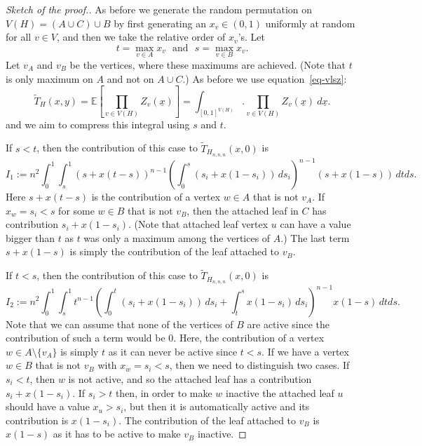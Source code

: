 \documentclass[12pt,a4paper]{amsart}
\numberwithin{equation}{section}
\theoremstyle{plain}
\theoremstyle{definition}
\newcommand{\1}{\textbf{1}}
\newcommand{\wT}{\widetilde{T}}
\begin{document}
\begin{proof}[Sketch of the proof.]
As before we generate the random permutation on \\ $V(H)=(A\cup C)\cup B$ by first generating an $x_v\in (0,1)$ uniformly at random for all $v\in V$, and then we take the relative order of $x_v$'s. Let
$$t=\max_{v\in A}x_v\ \ \ \text{and}\ \ \ s=\max_{v\in B}x_v.$$
Let $v_A$ and $v_B$ be the vertices, where these maximums are achieved.
(Note that $t$ is only maximum on $A$ and not on $A\cup C$.) As before we use equation~\ref{eq-vlsz}:
\begin{equation*} 
\wT_H(x,y)=\mathbb{E}\left[\prod_{v\in V(H)}Z_v(\underline{x})\right]=\int_{[0,1]^{V(H)}}.\prod_{v\in V(H)}Z_v(\underline{x})\ d\underline{x}.
\end{equation*}
and we aim to compress this integral using $s$ and $t$.

If $s<t$, then the contribution of this case to $\wT_{H_{n,n,n}}(x,0)$ is
\begin{equation} \label{int1}
I_1:=n^2\int_0^1\int_s^1(s+x(t-s))^{n-1}\left(\int_{0}^s(s_i+x(1-s_i))\, ds_i\right)^{n-1}(s+x(1-s))\, dt ds.
\end{equation}
Here $s+x(t-s)$ is the contribution of a vertex $w\in A$ that is not $v_A$. If $x_w=s_i<s$ for some $w\in B$ that is not $v_B$, then the attached leaf in $C$ has contribution $s_i+x(1-s_i)$. (Note that attached leaf vertex $u$ can have a value bigger than $t$ as $t$ was only a maximum among the vertices of $A$.) The last term $s+x(1-s)$ is simply the contribution of the leaf attached to $v_B$. 

If $t<s$, then the contribution of this case to $\wT_{H_{n,n,n}}(x,0)$ is
\begin{equation} \label{int2}
I_2:=n^2\int_0^1\int_s^1t^{n-1}\left(\int_{0}^t(s_i+x(1-s_i))\, ds_i+\int_{t}^sx(1-s_i)\, ds_i\right)^{n-1}x(1-s)\, dtds.
\end{equation} 
Note that we can assume that none of the vertices of $B$ are active since the contribution of such a term would be $0$.
Here, the contribution of a vertex $w\in A\setminus \{v_A\}$ is simply $t$ as it can never be active since $t<s$. If we have a vertex $w\in B$ that is not $v_B$ with $x_w=s_i<s$, then we need to distinguish two cases. If $s_i<t$, then $w$ is not active, and so the attached leaf has a contribution $s_i+x(1-s_i)$. If $s_i>t$ then, in order to make $w$ inactive the attached leaf $u$ should have a value $x_u>s_i$, but then it is automatically active and its contribution is $x(1-s_i)$. The contribution of the leaf attached to $v_B$ is $x(1-s)$ as it has to be active to make $v_B$ inactive.


\end{proof}
\end{document}
